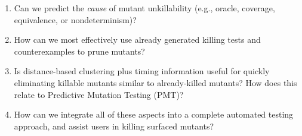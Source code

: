 \begin{enumerate}[labelsep=3pt,leftmargin=12pt]
  (predicted) FPF?
\item Can we predict the \emph{cause} of mutant
  unkillability (e.g., oracle, coverage, equivalence, or nondeterminism)?
\item How can  we most effectively use already generated killing tests
  and counterexamples to prune mutants?
\item Is distance-based clustering plus timing information useful for quickly
  eliminating killable mutants similar to already-killed mutants?  How
  does this relate to Predictive Mutation Testing (PMT)?
  \item How can we integrate all of these aspects into a complete
    automated testing approach, and assist users in killing surfaced mutants?

\end{enumerate}


